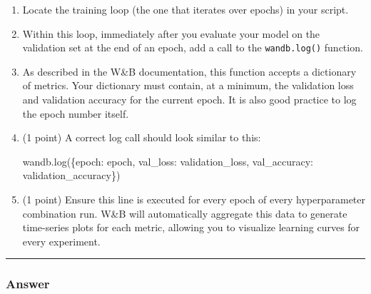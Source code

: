 \documentclass[
  letterpaper,
  DIV=11,
  numbers=noendperiod]{scrartcl}
\newenvironment{Shaded}{\begin{snugshade}}{\end{snugshade}}
\newcommand{\NormalTok}[1]{\textcolor[rgb]{0.00,0.23,0.31}{#1}}
\newcommand{\StringTok}[1]{\textcolor[rgb]{0.13,0.47,0.30}{#1}}
\begin{document}
\begin{enumerate}
\def\labelenumi{\arabic{enumi}.}
\item
  Locate the training loop (the one that iterates over epochs) in your
  script.
\item
  Within this loop, immediately after you evaluate your model on the
  validation set at the end of an epoch, add a call to the
  \texttt{wandb.log()} function.
\item
  As described in the W\&B documentation, this function accepts a
  dictionary of metrics. Your dictionary must contain, at a minimum, the
  validation loss and validation accuracy for the current epoch. It is
  also good practice to log the epoch number itself.
\item
  (1 point) A correct log call should look similar to this:

\begin{Shaded}
\begin{Highlighting}[]
\NormalTok{wandb.log(\{}\StringTok{\textquotesingle{}epoch\textquotesingle{}}\NormalTok{: epoch, }\StringTok{\textquotesingle{}val\_loss\textquotesingle{}}\NormalTok{: validation\_loss, }\StringTok{\textquotesingle{}val\_accuracy\textquotesingle{}}\NormalTok{: validation\_accuracy\})}
\end{Highlighting}
\end{Shaded}
\item
  (1 point) Ensure this line is executed for every epoch of every
  hyperparameter combination run. W\&B will automatically aggregate this
  data to generate time-series plots for each metric, allowing you to
  visualize learning curves for every experiment.
\end{enumerate}

\begin{center}\rule{0.5\linewidth}{0.5pt}\end{center}

\subsubsection{Answer}\label{answer-2}
\end{document}
